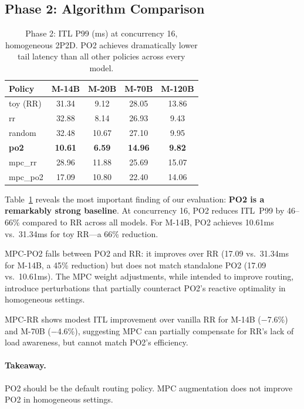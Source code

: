 \documentclass[runningheads]{llncs}
\begin{document}
\subsection{Phase 2: Algorithm Comparison}
\label{sec:phase2}

\begin{table}[t]
\caption{Phase 2: ITL P99 (ms) at concurrency 16, homogeneous 2P2D. PO2 achieves dramatically lower tail latency than all other policies across every model.}
\label{tab:phase2}
\centering
\small
\setlength{\tabcolsep}{4pt}
\begin{tabular}{l cccc}
\toprule
\textbf{Policy} & \textbf{M-14B} & \textbf{M-20B} & \textbf{M-70B} & \textbf{M-120B} \\
\midrule
toy (RR)   & 31.34 & 9.12 & 28.05 & 13.86 \\
rr         & 32.88 & 8.14 & 26.93 & 9.43 \\
random     & 32.48 & 10.67 & 27.10 & 9.95 \\
\rowcolor{po2red!8}
\textbf{po2} & \textbf{10.61} & \textbf{6.59} & \textbf{14.96} & \textbf{9.82} \\
mpc\_rr    & 28.96 & 11.88 & 25.69 & 15.07 \\
mpc\_po2   & 17.09 & 10.80 & 22.40 & 14.06 \\
\bottomrule
\end{tabular}
\end{table}

Table~\ref{tab:phase2} reveals the most important finding of our evaluation: \textbf{PO2 is a remarkably strong baseline}. At concurrency 16, PO2 reduces ITL~P99 by 46--66\% compared to RR across all models. For M-14B, PO2 achieves 10.61ms vs.\ 31.34ms for toy RR---a 66\% reduction.

MPC-PO2 falls between PO2 and RR: it improves over RR (17.09 vs.\ 31.34ms for M-14B, a 45\% reduction) but does not match standalone PO2 (17.09 vs.\ 10.61ms). The MPC weight adjustments, while intended to improve routing, introduce perturbations that partially counteract PO2's reactive optimality in homogeneous settings.

MPC-RR shows modest ITL improvement over vanilla RR for M-14B ($-$7.6\%) and M-70B ($-$4.6\%), suggesting MPC can partially compensate for RR's lack of load awareness, but cannot match PO2's efficiency.

\paragraph{Takeaway.} PO2 should be the default routing policy. MPC augmentation does not improve PO2 in homogeneous settings.
\end{document}
